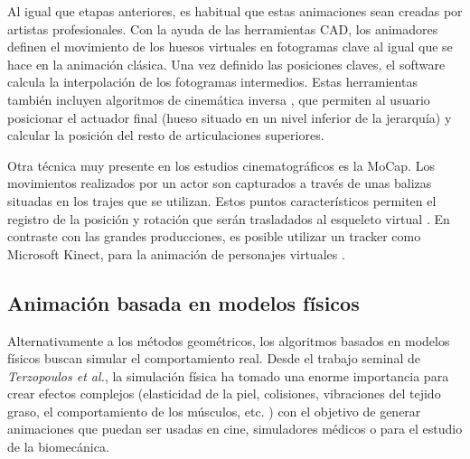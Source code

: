 Al igual que etapas anteriores, es habitual que estas animaciones sean creadas por artistas profesionales. Con la ayuda de las herramientas \ac{CAD}, los animadores definen el movimiento de los huesos virtuales en fotogramas clave \cite{keyframe} al igual que se hace en la animación clásica. Una vez definido las posiciones claves, el software calcula la interpolación de los fotogramas intermedios. Estas herramientas también incluyen algoritmos de cinemática inversa \cite{Shi:2007}, que permiten al usuario posicionar el actuador final (hueso situado en un nivel inferior de la jerarquía) y calcular la posición del resto de articulaciones superiores. 




Otra técnica muy presente en los estudios cinematográficos es la \acl{MoCap}. Los movimientos realizados por un actor son capturados a través de unas balizas situadas en los trajes que se utilizan. Estos puntos característicos permiten el registro de la posición y rotación que serán trasladados al esqueleto virtual \cite{Menache:1999}. En contraste con las grandes producciones, es posible utilizar un \ac{tracker} como Microsoft Kinect, para la animación de personajes virtuales \cite{Liu:2018}.




\subsection{Animación basada en modelos físicos}
\label{art:fisica}

Alternativamente a los métodos geométricos, los algoritmos basados en modelos físicos buscan simular el comportamiento real. Desde el trabajo seminal de \emph{Terzopoulos et al.}\cite{terzopoulos1987elastically}, la simulación física ha tomado una enorme importancia para crear  efectos complejos (elasticidad de la piel, colisiones, vibraciones del tejido graso, el comportamiento de los músculos, etc. ) con el objetivo de generar animaciones que puedan ser usadas en cine, simuladores médicos o para el estudio de la biomecánica. 

